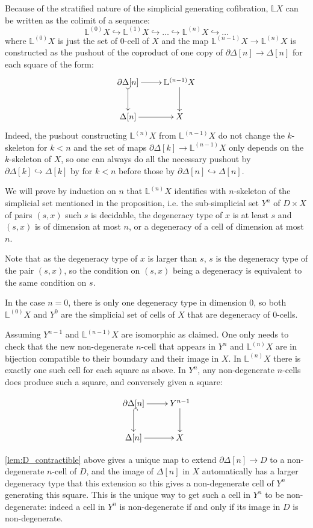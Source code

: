 \documentclass[reqno,10pt,a4paper,oneside,draft]{amsart}
\makeatletter
\renewenvironment{proof}[1][\proofname] {\par\pushQED{\qed}\normalfont\topsep6\p@\@plus6\p@\relax\trivlist\item[\hskip\labelsep\bf#1\@addpunct{.}]\ignorespaces}{\popQED\endtrivlist\@endpefalse}
\numberwithin{equation}{section}
\theoremstyle{mythm}
\theoremstyle{mydef}
\theoremstyle{myrmk}
\makeatother
\begin{document}
\begin{proof} Because of the stratified nature of the simplicial generating cofibration, $\mathbb{L} X$ can be written as the colimit of a sequence:
 \[ 
 \mathbb{L}^{(0)} X \hookrightarrow \mathbb{L}^{(1)} X \hookrightarrow \dots \hookrightarrow \mathbb{L}^{(n)} X \hookrightarrow \dots 
 \]
where $\mathbb{L}^{(0)} X$ is just the set of $0$-cell of $X$ and the map $\mathbb{L}^{(n-1)} X \rightarrow \mathbb{L}^{(n)} X$ is constructed as the pushout of the coproduct of one copy of $\partial \Delta[n] \rightarrow \Delta[n]$ for each square of the form:
\[ 
\xymatrix{\partial \Delta[n]  \ar[r] \ar@{>->}[d] & \mathbb{L}^{(n-1)} X \ar[d] \\ \Delta[n]  \ar[r] & X} 
\]
Indeed, the pushout constructing $\mathbb{L}^{(n)} X$ from $\mathbb{L}^{(n-1)} X$ do not change the $k$-skeleton for $k <n$ and the set of maps $\partial \Delta[k] \rightarrow \mathbb{L}^{(n-1)} X$ only depends on the $k$-skeleton of $X$, so one can always do all the necessary pushout by $\partial \Delta[k] \hookrightarrow \Delta[k]$ by for $k<n$ before those by $\partial \Delta[n] \hookrightarrow \Delta[n]$.


We will prove by induction on $n$ that $\mathbb{L}^{(n)} X$ identifies with $n$-skeleton of the simplicial set mentioned in the proposition, i.e. the sub-simplicial set $Y^n$ of $D \times X$ of pairs $(s,x)$ such $s$ is decidable,  the degeneracy type of $x$ is at least $s$ and $(s,x)$ is of dimension at most $n$, or a degeneracy of a cell of dimension at most $n$.

Note that as the degeneracy type of $x$ is larger than $s$, $s$ is the degeneracy type of the pair $(s,x)$, so the condition on $(s,x)$ being a degeneracy is equivalent to the same condition on $s$.

In the case $n=0$, there is only one degeneracy type in dimension $0$, so both $\mathbb{L}^{(0)} X $ and $Y^0$ are the simplicial set of cells of $X$ that are degeneracy of $0$-cells.

Assuming $Y^{n-1}$ and $\mathbb{L}^{(n-1)} X$ are isomorphic as claimed. One only needs to check that the new non-degenerate $n$-cell that appears in $Y^{n}$ and $\mathbb{L}^{(n)} X $ are in bijection compatible to their boundary and their image in $X$.
In $\mathbb{L}^{(n)} X $ there is exactly one such cell for each square as above. In $Y^{n}$, any non-degenerate $n$-cells does produce such a square, and conversely given a square:

\[ \xymatrix{\partial \Delta[n]  \ar[r] \ar@{^{(}->}[d] & Y^{n-1} \ar[d] \\ \Delta[n]  \ar[r] & X} \]

\cref{lem:D_contractible} above gives a unique map to extend $\partial \Delta[n] \rightarrow D$ to a non-degenerate $n$-cell of $D$, and the image of $\Delta[n]$ in $X$ automatically has a larger degeneracy type that this extension so this gives a non-degenerate cell of $Y^{n}$ generating this square. This is the unique way to get such a cell in $Y^n$ to be non-degenerate: indeed a cell in $Y^n$ is non-degenerate if and only if its image in $D$ is non-degenerate.
\end{proof}
\end{document}
